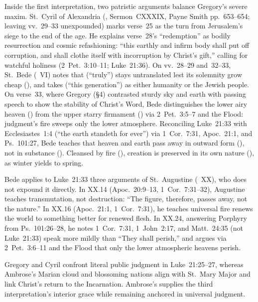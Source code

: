 Inside the first interpretation, two patristic arguments balance Gregory's severe maxim. St.~Cyril of Alexandria (, Sermon~CXXXIX, Payne Smith pp.~653--654; leaving vv.~29--33 unexpounded) marks verse~25 as the turn from Jerusalem's siege to the end of the age. He explains verse~28's ``redemption'' as bodily resurrection and cosmic refashioning: ``this earthly and infirm body shall put off corruption, and shall clothe itself with incorruption by Christ's gift,'' calling for watchful holiness (2~Pet.~3:10--11; Luke~21:36). On vv.~28--29 and~32--33, St.~Bede (~VI) notes that  (``truly'') stays untranslated lest its solemnity grow cheap (), and takes  (``this generation'') as either humanity or the Jewish people. On verse~33, where Gregory (\S4) contrasted sturdy sky and earth with passing speech to show the stability of Christ's Word, Bede distinguishes the lower airy heaven () from the upper starry firmament () via 2~Pet.~3:5--7 and the Flood: judgment's fire sweeps only the lower atmosphere. Reconciling Luke~21:33 with Ecclesiastes~1:4 (``the earth standeth for ever'') via 1~Cor.~7:31, Apoc.~21:1, and Ps.~101:27, Bede teaches that heaven and earth pass away in outward form (), not in substance (). Cleansed by fire (), creation is preserved in its own nature (), as winter yields to spring.

Bede applies to Luke~21:33 three arguments of St.~Augustine (~XX), who does not expound it directly. In XX.14 (Apoc.~20:9--13, 1~Cor.~7:31--32), Augustine teaches transmutation, not destruction: ``The figure, therefore, passes away, not the nature.'' In XX.16 (Apoc.~21:1, 1~Cor.~7:31), he teaches universal fire renews the world to something better for renewed flesh. In XX.24, answering Porphyry from Ps.~101:26--28, he notes 1~Cor.~7:31, 1~John~2:17, and Matt.~24:35 (not Luke~21:33) speak more mildly than ``They shall perish,'' and argues via 2~Pet.~3:6--11 and the Flood that only the lower atmospheric heavens perish.

Gregory and Cyril confront literal public judgment in Luke~21:25--27, whereas Ambrose's Marian cloud and blossoming nations align with St.~Mary Major and link Christ's return to the Incarnation. Ambrose's  supplies the third interpretation's interior grace while remaining anchored in universal judgment.

